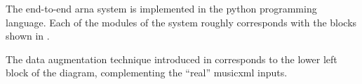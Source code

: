 
The end-to-end \gls{arna} system is implemented in the
python programming language. Each of the modules of the
system roughly corresponds with the blocks shown in
.


The data augmentation technique introduced in
 corresponds to the
lower left block of the diagram, complementing the ``real''
\gls{musicxml} inputs.
